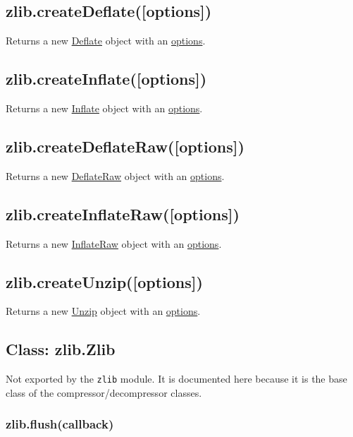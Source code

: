 \subsection{zlib.createDeflate({[}options{]})}

Returns a new \hyperref[zlib\_class\_zlib\_deflate]{Deflate} object with
an \hyperref[zlib\_options]{options}.

\subsection{zlib.createInflate({[}options{]})}

Returns a new \hyperref[zlib\_class\_zlib\_inflate]{Inflate} object with
an \hyperref[zlib\_options]{options}.

\subsection{zlib.createDeflateRaw({[}options{]})}

Returns a new \hyperref[zlib\_class\_zlib\_deflateraw]{DeflateRaw}
object with an \hyperref[zlib\_options]{options}.

\subsection{zlib.createInflateRaw({[}options{]})}

Returns a new \hyperref[zlib\_class\_zlib\_inflateraw]{InflateRaw}
object with an \hyperref[zlib\_options]{options}.

\subsection{zlib.createUnzip({[}options{]})}

Returns a new \hyperref[zlib\_class\_zlib\_unzip]{Unzip} object with an
\hyperref[zlib\_options]{options}.

\subsection{Class: zlib.Zlib}

Not exported by the \texttt{zlib} module. It is documented here because
it is the base class of the compressor/decompressor classes.

\subsubsection{zlib.flush(callback)}

